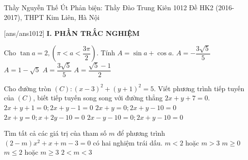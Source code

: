 \begin{name}
{Thầy Nguyễn Thế Út \newline Phản biện: Thầy Đào Trung Kiên}
{1012 Đề HK2 (2016-2017), THPT Kim Liên, Hà Nội}
	\end{name}
	\setcounter{ex}{0}\setcounter{bt}{0}
	[ans/ans1012]
\noindent\textbf{I. PHẦN TRẮC NGHIỆM}

\begin{ex}%
	Cho $\tan a=2,\left(\pi<a<\dfrac{3\pi}{2}\right).$ Tính $A=\sin a+\cos a.$
	\choice
	{\True $A=-\dfrac{3\sqrt{5}}{5}$}
	{$A=1-\sqrt{5}$}
	{$A=\dfrac{3\sqrt{5}}{5}$}
	{$A=\dfrac{\sqrt{5}-1}{2}$}
\end{ex}
\begin{ex}%
	Cho đường tròn $(C): (x-3)^2+(y+1)^2=5$. Viết phương trình tiếp tuyến của $(C)$, biết tiếp tuyến song song với đường thẳng $2x+y+7=0$. 
	\choice
	{$2x+y+1=0; 2x+y-1=0$}
	{\True $2x+y=0; 2x+y-10=0$}
	{$2x+y=0; x+2y-10=0$}
	{$2x-y-10=0; 2x+y-10=0$}
\end{ex}
\begin{ex}%
	Tìm tất cả các giá trị của tham số $m$ để phương trình $(2-m)x^2+x+m-3=0$ có hai nghiệm trái dấu.
	\choice
	{\True $m<2$ hoặc $m>3$}
	{$m\ge 0$}
	{$m\le 2$ hoặc $m\ge 3$}
	{$2<m<3$}
\end{ex}
